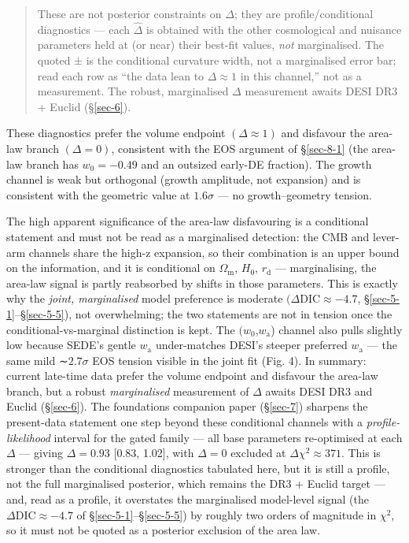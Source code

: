\documentclass[preprint,12pt]{elsarticle}
\begin{document}
\begin{quote}
These are not posterior constraints on \(\Delta\); they are
profile/conditional diagnostics --- each \(\hat{\Delta}\) is obtained
with the other cosmological and nuisance parameters held at (or near)
their best-fit values, \emph{not} marginalised. The quoted ± is the
conditional curvature width, not a marginalised error bar; read each row
as ``the data lean to \(\Delta  \approx  1\) in this channel,'' not as a
measurement. The robust, marginalised \(\Delta\) measurement awaits DESI
DR3 + Euclid (§\ref{sec-6}).
\end{quote}

These diagnostics prefer the volume endpoint \((\Delta  \approx  1)\)
and disfavour the area-law branch \((\Delta  = 0)\), consistent with the
EOS argument of §\ref{sec-8-1} (the area-law branch has
\(w_{0} = -0.49\) and an outsized early-DE fraction). The growth channel
is weak but orthogonal (growth amplitude, not expansion) and is
consistent with the geometric value at \(1.6\sigma\) --- no
growth--geometry tension.

The high apparent significance of the area-law disfavouring is a
conditional statement and must not be read as a marginalised detection:
the CMB and lever-arm channels share the high-z expansion, so their
combination is an upper bound on the information, and it is conditional
on \(\Omega _{\mathrm{m}}\), \(H_{0}\), \(r_{\mathrm{d}}\) ---
marginalising, the area-law signal is partly reabsorbed by shifts in
those parameters. This is exactly why the \emph{joint, marginalised}
model preference is moderate \((\Delta \mathrm{DIC} \approx  -4.7\),
§\ref{sec-5-1}--§\ref{sec-5-5}), not overwhelming; the two statements
are not in tension once the conditional-vs-marginal distinction is kept.
The \((w_{0}\),\(w_{\mathrm{a}}\)) channel also pulls slightly low
because SEDE's gentle \(w_{\mathrm{a}}\) under-matches DESI's steeper
preferred \(w_{\mathrm{a}}\) --- the same mild ∼\(2.7\sigma\) EOS
tension visible in the joint fit (Fig. 4). In summary: current late-time
data prefer the volume endpoint and disfavour the area-law branch, but a
robust \emph{marginalised} measurement of \(\Delta\) awaits DESI DR3 and
Euclid (§\ref{sec-6}). The foundations companion paper (§\ref{sec-7})
\citep{Pandev:2026foundations} sharpens the present-data statement one
step beyond these conditional channels with a \emph{profile-likelihood}
interval for the gated family --- all base parameters re-optimised at
each \(\Delta\) --- giving \(\Delta  = 0.93\) {[}0.83, 1.02{]}, with
\(\Delta  = 0\) excluded at \(\Delta \chi ^{2} \approx  371\). This is
stronger than the conditional diagnostics tabulated here, but it is
still a profile, not the full marginalised posterior, which remains the
DR3 + Euclid target --- and, read as a profile, it overstates the
marginalised model-level signal (the
\(\Delta \mathrm{DIC} \approx  -4.7\) of §\ref{sec-5-1}--§\ref{sec-5-5})
by roughly two orders of magnitude in \(\chi ^{2}\), so it must not be
quoted as a posterior exclusion of the area law.
\end{document}
